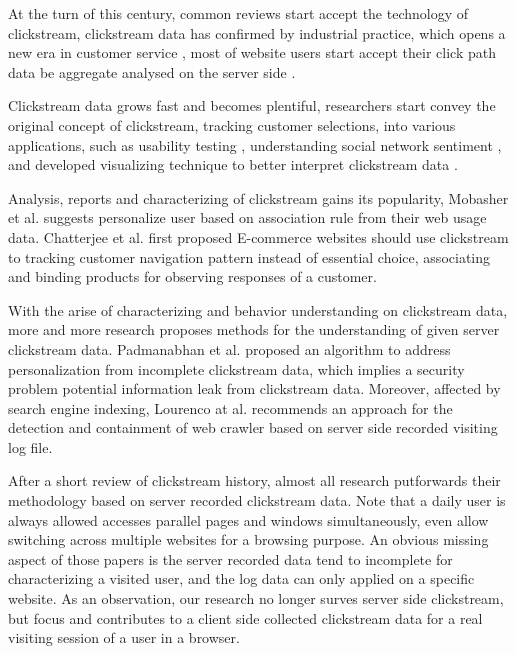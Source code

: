 At the turn of this century, common reviews start accept the technology of clickstream,
clickstream data has confirmed by industrial practice, which opens a new era in 
customer service \cite{walsh2000internet}, most of website users start accept their click path data 
be aggregate analysed on the server side \cite{carr2000hypermediation}.

Clickstream data grows fast and becomes plentiful, researchers start convey the original concept of clickstream,
tracking customer selections, into various applications, such as usability testing \cite{Waterson:2002:LOW:506443.506602},
understanding social network sentiment \cite{Schneider:2009:UOS:1644893.1644899}, and developed visualizing
technique to better interpret clickstream data \cite{Waterson:2002:DTU:1556262.1556276}.

Analysis, reports and characterizing of clickstream gains its popularity, Mobasher et al. \cite{Mobasher:2001:EPB:502932.502935}
suggests personalize user based on association rule from their web usage data. Chatterjee et al. \cite{chatterjee2003modeling} 
first proposed E-commerce websites should use clickstream to tracking customer navigation pattern instead of essential choice, 
associating and binding products for observing responses of a customer.

With the arise of characterizing and behavior understanding on clickstream data, more 
and more research proposes methods for the understanding of given server clickstream data.
Padmanabhan et al. \cite{Padmanabhan:2001:PID:502512.502535}
proposed an algorithm to address personalization from incomplete clickstream data, which implies
a security problem potential information leak from clickstream data. 
Moreover, affected by search engine indexing, Lourenco at al. \cite{Lourenco:2006:CWC:1145581.1145634} recommends an approach for
the detection and containment of web crawler based on server side recorded visiting log file.

After a short review of clickstream history, almost all research putforwards their 
methodology based on server recorded clickstream data.
Note that a daily user is always allowed accesses parallel pages and windows simultaneously,
even allow switching across multiple websites for a browsing purpose.
An obvious missing aspect of those papers is the server recorded data tend to incomplete for 
characterizing a visited user, and the log data can only applied on a specific website. 
As an observation, our research no longer surves server side clickstream, 
but focus and contributes to a client side collected clickstream data 
for a real visiting session of a user in a browser.

